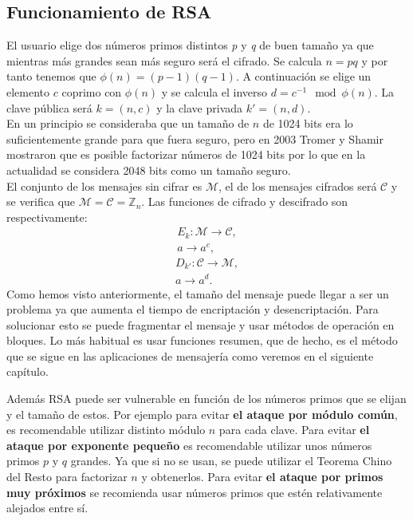 \subsection{Funcionamiento de RSA}
El usuario elige dos números primos distintos \emph{p} y \emph{q} de buen tamaño ya que mientras más grandes sean más seguro será el cifrado.
Se calcula $n = pq$ y por tanto tenemos que $\phi(n) = (p-1)(q-1)$. A continuación se elige un elemento $c$ coprimo con $\phi(n)$ y se calcula el inverso $d = c^{-1}\mod \phi(n)$. La clave pública será $k=(n,c)$ y la clave privada $k'=(n,d)$.\\
En un principio se consideraba que un tamaño de $n$ de 1024 bits era lo suficientemente grande para que fuera seguro, pero en 2003 Tromer y Shamir mostraron que es posible factorizar números de 1024 bits \cite{1024RSA} por lo que en la actualidad se considera 2048 bits como un tamaño seguro.\\
El conjunto de los mensajes sin cifrar es $\mathcal{M}$, el de los mensajes cifrados será $\mathcal{C}$ y se verifica que $\mathcal{M} = \mathcal{C} = \mathbb{Z}_n$. Las funciones de cifrado y descifrado son respectivamente:
\begin{align*}
	E_{k}:\mathcal{M}\rightarrow\mathcal{C},\\
	a \rightarrow a^c,
\end{align*}
\begin{align*}
	D_{k'}:\mathcal{C}\rightarrow\mathcal{M},\\
	a \rightarrow a^d.
\end{align*}
Como hemos visto anteriormente, el tamaño del mensaje puede llegar a ser un problema ya que aumenta el tiempo de encriptación y desencriptación. Para solucionar esto se puede fragmentar el mensaje y usar métodos de operación en bloques. Lo más habitual es usar funciones resumen, que de hecho, es el método que se sigue en las aplicaciones de mensajería como veremos en el siguiente capítulo.

Además RSA puede ser vulnerable en función de los números primos que se elijan y el tamaño de estos. 
Por ejemplo para evitar \textbf{el ataque por módulo común}, es recomendable utilizar distinto módulo $n$ para cada clave. 
Para evitar \textbf{el ataque por exponente pequeño} es recomendable utilizar unos números primos $p$ y $q$ grandes. Ya que si no se usan, se puede utilizar el Teorema Chino del Resto para factorizar $n$ y obtenerlos. 
Para evitar \textbf{el ataque por primos muy próximos} se recomienda usar números primos que estén relativamente alejados entre sí. 

